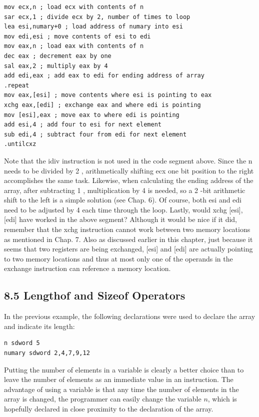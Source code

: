\documentclass[10pt]{article}
\begin{document}
\begin{verbatim}
mov ecx,n ; load ecx with contents of n
sar ecx,1 ; divide ecx by 2, number of times to loop
lea esi,numary+0 ; load address of numary into esi
mov edi,esi ; move contents of esi to edi
mov eax,n ; load eax with contents of n
dec eax ; decrement eax by one
sal eax,2 ; multiply eax by 4
add edi,eax ; add eax to edi for ending address of array
.repeat
mov eax,[esi] ; move contents where esi is pointing to eax
xchg eax,[edi] ; exchange eax and where edi is pointing
mov [esi],eax ; move eax to where edi is pointing
add esi,4 ; add four to esi for next element
sub edi,4 ; subtract four from edi for next element
.untilcxz
\end{verbatim}

Note that the idiv instruction is not used in the code segment above. Since the n needs to be divided by 2 , arithmetically shifting ecx one bit position to the right accomplishes the same task. Likewise, when calculating the ending address of the array, after subtracting 1 , multiplication by 4 is needed, so a 2 -bit arithmetic shift to the left is a simple solution (see Chap. 6). Of course, both esi and edi need to be adjusted by 4 each time through the loop. Lastly, would xchg [esi], [edi] have worked in the above segment? Although it would be nice if it did, remember that the xchg instruction cannot work between two memory locations as mentioned in Chap. 7. Also as discussed earlier in this chapter, just because it seems that two registers are being exchanged, [esi] and [edi] are actually pointing to two memory locations and thus at most only one of the operands in the exchange instruction can reference a memory location.

\subsection*{8.5 Lengthof and Sizeof Operators}
In the previous example, the following declarations were used to declare the array and indicate its length:

\begin{verbatim}
n sdword 5
numary sdword 2,4,7,9,12
\end{verbatim}

Putting the number of elements in a variable is clearly a better choice than to leave the number of elements as an immediate value in an instruction. The advantage of using a variable is that any time the number of elements in the array is changed, the programmer can easily change the variable $n$, which is hopefully declared in close proximity to the declaration of the array.
\end{document}
